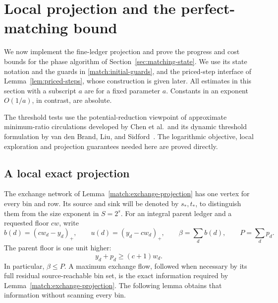 \section{Local projection and the perfect-matching bound}
\label{sec:projection-analysis}

We now implement the fine-ledger projection and prove the progress and
cost bounds for the phase algorithm of
Section~\ref{sec:matching-state}.  We use its state notation and the
guards in \eqref{match:initial-guards}, and the priced-step interface of
Lemma~\ref{lem:priced-steps}, whose construction is given later.
All estimates in this section with a subscript \(a\) are for a fixed
parameter \(a\).  Constants in an exponent \(O(1/a)\), in contrast,
are absolute.

The threshold tests use the potential-reduction viewpoint of approximate
minimum-ratio circulations developed by Chen et al.\ and its dynamic
threshold formulation by van den Brand, Liu, and
Sidford~\cite{FlowRandomized,BrandLiuSidford2023}. The logarithmic
objective, local exploration and projection guarantees needed here are
proved directly.

\subsection{A local exact projection}

The exchange network of Lemma~\ref{match:exchange-projection} has one vertex
for every bin and row.  Its source and sink will be denoted by
\(s_*,t_*\), to distinguish them from the size exponent in \(S=2^s\).
For an integral parent ledger and a requested floor \(cw\), write
\begin{equation}
\label{proj:deficits}
 b(d)=(cw_d-y_d)_+,\qquad
 u(d)=(y_d-cw_d)_+,\qquad
 \beta=\sum_d b(d),\qquad P=\sum_d p_d .
\end{equation}
The parent floor is one unit higher:
\begin{equation}
\label{proj:parent}
                         y_d+p_d\ge(c+1)w_d .
\end{equation}
In particular, \(\beta\le P\).  A maximum exchange flow, followed when
necessary by its full residual source-reachable bin set, is the exact
information required by Lemma~\ref{match:exchange-projection}.  The following
lemma obtains that information without scanning every bin.

